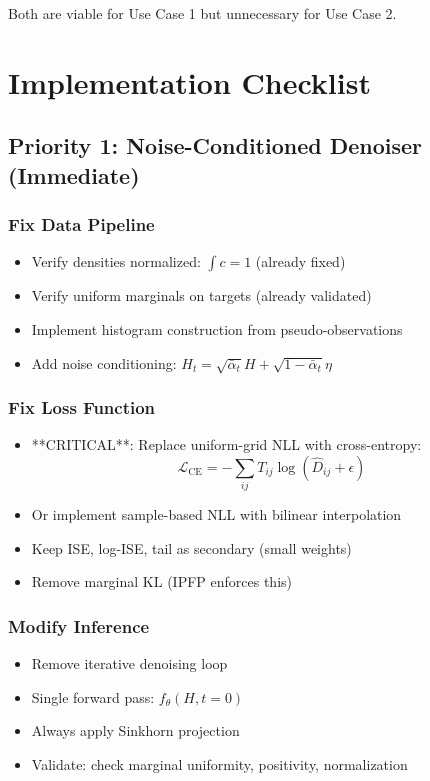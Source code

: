 \documentclass[11pt]{article}
\begin{document}
Both are viable for Use Case 1 but unnecessary for Use Case 2.

\section{Implementation Checklist}

\subsection{Priority 1: Noise-Conditioned Denoiser (Immediate)}

\subsubsection{Fix Data Pipeline}
\begin{itemize}
    \item[$\checkmark$] Verify densities normalized: $\int c = 1$ (already fixed)
    \item[$\checkmark$] Verify uniform marginals on targets (already validated)
    \item[$\square$] Implement histogram construction from pseudo-observations
    \item[$\square$] Add noise conditioning: $H_t = \sqrt{\bar{\alpha}_t} H + \sqrt{1-\bar{\alpha}_t} \eta$
\end{itemize}

\subsubsection{Fix Loss Function}
\begin{itemize}
    \item[$\square$] **CRITICAL**: Replace uniform-grid NLL with cross-entropy:
    \begin{equation*}
    \mathcal{L}_{\text{CE}} = -\sum_{ij} T_{ij} \log(\hat{D}_{ij} + \epsilon)
    \end{equation*}
    \item[$\square$] Or implement sample-based NLL with bilinear interpolation
    \item[$\square$] Keep ISE, log-ISE, tail as secondary (small weights)
    \item[$\square$] Remove marginal KL (IPFP enforces this)
\end{itemize}

\subsubsection{Modify Inference}
\begin{itemize}
    \item[$\square$] Remove iterative denoising loop
    \item[$\square$] Single forward pass: $f_\theta(H, t=0)$
    \item[$\square$] Always apply Sinkhorn projection
    \item[$\square$] Validate: check marginal uniformity, positivity, normalization
\end{itemize}
\end{document}
